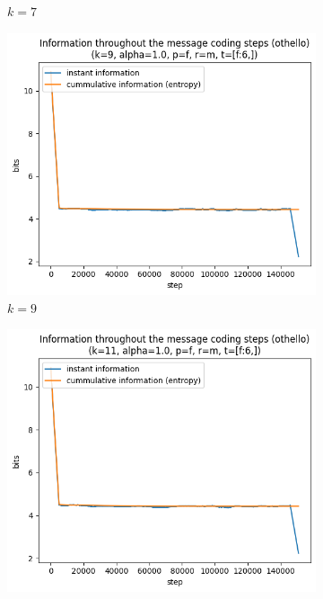 \documentclass{article}
\begin{document}
\begin{figure}
\begin{subfigure}[b]{0.3\textwidth}
\begin{center}
        \end{center}
        \caption{$k = 7$}
        \label{fig:results-pattern-size-other-7}
    \end{subfigure}
    \hfill
    \begin{subfigure}[b]{0.3\textwidth}
        \begin{center}
            \includegraphics[width=1.0\linewidth]{../scripts/images/othello_9_1.0_f_m_[f:6,].png}
        \end{center}
        \caption{$k = 9$}
        \label{fig:results-pattern-size-other-9}
    \end{subfigure}
    \begin{subfigure}[b]{0.3\textwidth}
        \begin{center}
            \includegraphics[width=1.0\linewidth]{../scripts/images/othello_11_1.0_f_m_[f:6,].png}

\end{center}
\end{subfigure}
\end{figure}
\end{document}
